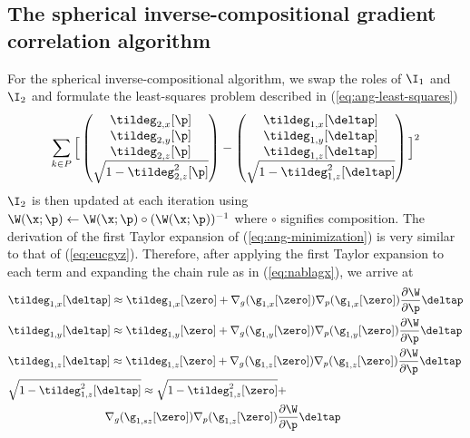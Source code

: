 \subsection{The spherical inverse-compositional gradient correlation algorithm}\label{subsec:3danginvcomp}
For the spherical inverse-compositional algorithm, we swap the roles of $\I_1$ and $\I_2$ and formulate the least-squares problem described in (\ref{eq:ang-least-squares})
\begin{equation}\label{eq:ang-minimization}
    \sum_{k \in P} \Big[ 
        \begin{pmatrix}
            \tildeg_{2,x}[\p] \\ 
            \tildeg_{2,y}[\p] \\ 
            \tildeg_{2,z}[\p] \\ 
            \sqrt{1 - \tildeg_{2,z}^2[\p]}
        \end{pmatrix}
        -
        \begin{pmatrix}
            \tildeg_{1,x}[\deltap] \\ 
            \tildeg_{1,y}[\deltap] \\ 
            \tildeg_{1,z}[\deltap] \\ 
            \sqrt{1 - \tildeg_{1,z}^2[\deltap]}
        \end{pmatrix}
        \Big] ^2
\end{equation}
$\I_2$ is then updated at each iteration using $\W(\x;\p) \leftarrow \W(\x;\p) \circ (\W(\x;\p))^{-1}$ where $\circ$ signifies composition. The derivation of the first Taylor expansion of (\ref{eq:ang-minimization}) is very similar to that of (\ref{eq:eucgyz}). Therefore, after applying the first Taylor expansion to each term and expanding the chain rule as in (\ref{eq:nablagx}), we arrive at
\begin{equation}
  \begin{aligned}\label{eq:anggxyz}
    &\tildeg_{1,x}[\deltap] \approx \tildeg_{1,x}[\zero] + \nabla_g (\g_{1,x}[\zero]) \nabla_p (\g_{1,x}[\zero]) \frac{\partial \W}{\partial \p} \deltap \\  
    &\tildeg_{1,y}[\deltap] \approx \tildeg_{1,y}[\zero] + \nabla_g (\g_{1,y}[\zero]) \nabla_p (\g_{1,y}[\zero]) \frac{\partial \W}{\partial \p} \deltap \\
    &\tildeg_{1,z}[\deltap] \approx \tildeg_{1,z}[\zero] + \nabla_g (\g_{1,z}[\zero]) \nabla_p (\g_{1,z}[\zero])  \frac{\partial \W}{\partial \p} \deltap \\
    &\sqrt{1 - \tildeg_{1,z}^2[\deltap]} \approx \sqrt{1 - \tildeg_{1,z}^2[\zero]} + \\
    & \hspace{30 mm} \nabla_g (\g_{1,sz}[\zero]) \nabla_p (\g_{1,z}[\zero])  \frac{\partial \W}{\partial \p} \deltap
  \end{aligned}
\end{equation}
